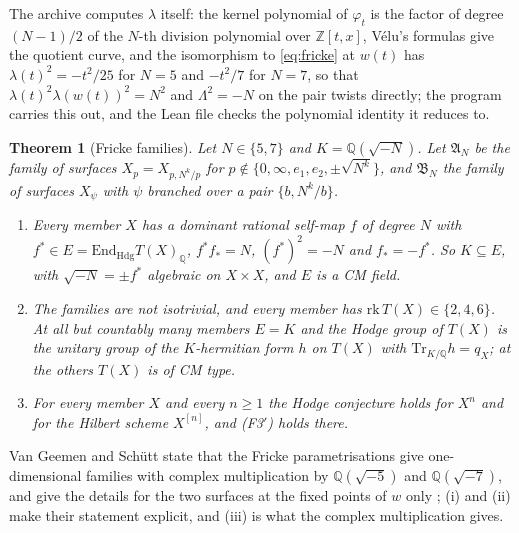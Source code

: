\documentclass[11pt,reqno]{amsart}
\numberwithin{equation}{section}
\theoremstyle{plain}
\newtheorem{theorem}{Theorem}[section]
\theoremstyle{definition}
\newcommand{\QQ}{\mathbb{Q}}
\newcommand{\ZZ}{\mathbb{Z}}
\newcommand{\Hdg}{\mathrm{Hdg}}
\newcommand{\End}{\mathrm{End}}
\newcommand{\Tr}{\mathrm{Tr}}
\newcommand{\Fiii}{\texorpdfstring{\textup{(F3$'$)}}{(F3')}}
\begin{document}
The archive \cite{BB26code} computes $\lambda$ itself: the kernel polynomial of $\varphi_{t}$ is the factor of degree $(N-1)/2$ of the $N$-th division polynomial over $\ZZ[t,x]$, V\'elu's formulas give the quotient curve, and the isomorphism to \eqref{eq:fricke} at $w(t)$ has $\lambda(t)^{2}=-t^{2}/25$ for $N=5$ and $-t^{2}/7$ for $N=7$, so that $\lambda(t)^{2}\lambda(w(t))^{2}=N^{2}$ and $\Lambda^{2}=-N$ on the pair twists directly; the program  carries this out, and the Lean file checks the polynomial identity it reduces to.

\begin{theorem}[Fricke families]\label{thm:fricke}
Let $N\in\{5,7\}$ and $K=\QQ(\sqrt{-N})$. Let $\mathfrak{A}_{N}$ be the family of surfaces $X_{p}=X_{p,N^{k}/p}$ for $p\notin\{0,\infty,e_{1},e_{2},\pm\sqrt{N^{k}}\}$, and $\mathfrak{B}_{N}$ the family of surfaces $X_{\psi}$ with $\psi$ branched over a pair $\{b,N^{k}/b\}$.
\begin{enumerate}[label=\textup{(\roman*)},leftmargin=2.4em,itemsep=2pt]
\item Every member $X$ has a dominant rational self-map $f$ of degree $N$ with $f^{*}\in E=\End_{\Hdg}T(X)_{\QQ}$, $f^{*}f_{*}=N$, $(f^{*})^{2}=-N$ and $f_{*}=-f^{*}$. So $K\subseteq E$, with $\sqrt{-N}=\pm f^{*}$ algebraic on $X\times X$, and $E$ is a CM field.
\item The families are not isotrivial, and every member has $\mathrm{rk}\,T(X)\in\{2,4,6\}$. At all but countably many members $E=K$ and the Hodge group of $T(X)$ is the unitary group of the $K$-hermitian form $h$ on $T(X)$ with $\Tr_{K/\QQ}h=q_{X}$; at the others $T(X)$ is of CM type.
\item For every member $X$ and every $n\ge1$ the Hodge conjecture holds for $X^{n}$ and for the Hilbert scheme $X^{[n]}$, and \Fiii{} holds there.
\end{enumerate}
\end{theorem}

Van Geemen and Sch\"utt state that the Fricke parametrisations give one-dimensional families with complex multiplication by $\QQ(\sqrt{-5})$ and $\QQ(\sqrt{-7})$, and give the details for the two surfaces at the fixed points of $w$ only \cite[\S7.6]{vGS25}; (i) and (ii) make their statement explicit, and (iii) is what the complex multiplication gives.
\end{document}
